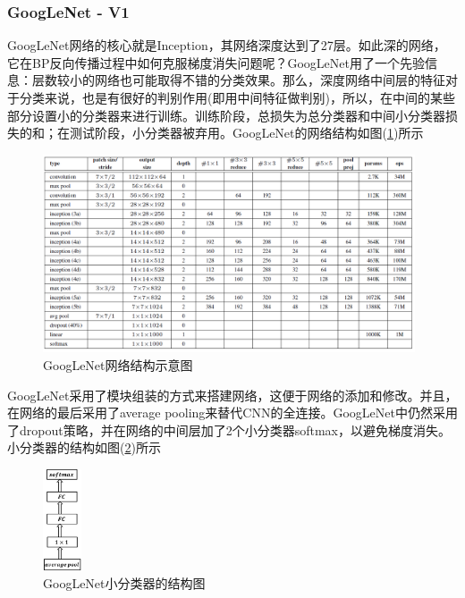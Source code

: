         \subsubsection{GoogLeNet - V1}
            \par
            GoogLeNet\cite{2014.Christian}网络的核心就是Inception，其网络深度达到了27层。如此深的网络，它在BP反向传播过程中如何克服梯度消失问题呢？GoogLeNet用了一个先验信息：层数较小的网络也可能取得不错的分类效果。那么，深度网络中间层的特征对于分类来说，也是有很好的判别作用(即用中间特征做判别)，所以，在中间的某些部分设置小的分类器来进行训练。训练阶段，总损失为总分类器和中间小分类器损失的和；在测试阶段，小分类器被弃用。GoogLeNet的网络结构如图(\ref{fig:GoogLeNet网络结构示意图})所示
             \begin{figure}[H]
            \centering
            \includegraphics[width=11cm]{images/GoogLeNet_steucture.jpg}
            \caption{GoogLeNet网络结构示意图}
            \label{fig:GoogLeNet网络结构示意图}
            \end{figure}
            GoogLeNet采用了模块组装的方式来搭建网络，这便于网络的添加和修改。并且，在网络的最后采用了average pooling来替代CNN的全连接。GoogLeNet中仍然采用了dropout策略，并在网络的中间层加了2个小分类器softmax，以避免梯度消失。小分类器的结构如图(\ref{fig:GoogLeNet小分类器的结构图})所示
             \begin{figure}[H]
            \centering
            \includegraphics[height=3cm]{images/The_structure_of_GoogLeNet_small_classifier.jpg}
            \caption{GoogLeNet小分类器的结构图}
            \label{fig:GoogLeNet小分类器的结构图}
            \end{figure}

